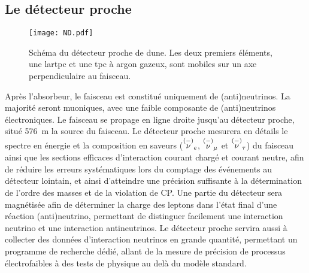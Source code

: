    \subsection{Le détecteur proche}\label{sec::near_detector}

      \begin{figure}[htbp]
        \centering
        \texttt{[image: ND.pdf]}
        \caption[Schéma du détecteur proche de DU$\nu$E]{\label{fig::ND}Schéma du détecteur proche de \gls{dune}. Les deux premiers éléments, une \gls{lartpc} et une \gls{tpc} à argon gazeux, sont mobiles sur un axe perpendiculaire au faisceau.}
      \end{figure}
      Après l'absorbeur, le faisceau est constitué uniquement de (anti)neutrinos. La majorité seront muoniques, avec une faible composante de (anti)neutrinos électroniques. Le faisceau se propage en ligne droite jusqu'au détecteur proche, situé \SI{576}{\meter} la source du faisceau. Le détecteur proche mesurera en détails le spectre en énergie et la composition en saveurs ($\overset{(-)}{\nu}_e$, $\overset{(-)}{\nu}_{\mu}$ et $\overset{(-)}{\nu}_{\tau}$) du faisceau ainsi que les sections efficaces d'interaction courant chargé et courant neutre, afin de réduire les erreurs systématiques lors du comptage des événements au détecteur lointain, et ainsi d'atteindre une précision suffisante à la détermination de l'ordre des masses et de la violation de CP. Une partie du détecteur sera magnétisée afin de déterminer la charge des leptons dans l'état final d'une réaction (anti)neutrino, permettant de distinguer facilement une interaction neutrino et une interaction antineutrinos. Le détecteur proche servira aussi à collecter des données d'interaction neutrinos en grande quantité, permettant un programme de recherche dédié, allant de la mesure de précision de processus électrofaibles à des tests de physique au delà du modèle standard\cite{Collaboration2015}.

